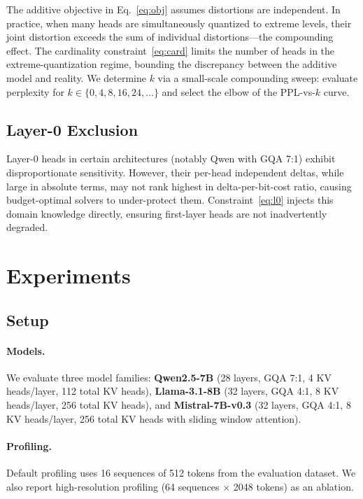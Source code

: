 \documentclass[11pt]{article}
\begin{document}
The additive objective in Eq.~\eqref{eq:obj} assumes distortions are independent.
In practice, when many heads are simultaneously quantized to extreme levels, their joint distortion exceeds the sum of individual distortions---the compounding effect.
The cardinality constraint~\eqref{eq:card} limits the number of heads in the extreme-quantization regime, bounding the discrepancy between the additive model and reality.
We determine $k$ via a small-scale compounding sweep: evaluate perplexity for $k \in \{0, 4, 8, 16, 24, \ldots\}$ and select the elbow of the PPL-vs-$k$ curve.

\subsection{Layer-0 Exclusion}

Layer-0 heads in certain architectures (notably Qwen with GQA 7:1) exhibit disproportionate sensitivity.
However, their per-head independent deltas, while large in absolute terms, may not rank highest in delta-per-bit-cost ratio, causing budget-optimal solvers to under-protect them.
Constraint~\eqref{eq:l0} injects this domain knowledge directly, ensuring first-layer heads are not inadvertently degraded.

\section{Experiments}
\label{sec:exp}

\subsection{Setup}

\paragraph{Models.} We evaluate three model families:
\textbf{Qwen2.5-7B} (28 layers, GQA 7:1, 4 KV heads/layer, 112 total KV heads),
\textbf{Llama-3.1-8B} (32 layers, GQA 4:1, 8 KV heads/layer, 256 total KV heads), and
\textbf{Mistral-7B-v0.3} (32 layers, GQA 4:1, 8 KV heads/layer, 256 total KV heads with sliding window attention).

\paragraph{Profiling.} Default profiling uses 16 sequences of 512 tokens from the evaluation dataset. We also report high-resolution profiling (64 sequences $\times$ 2048 tokens) as an ablation.
\end{document}
